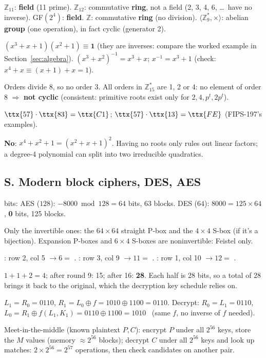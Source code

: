 \ans $\mathbb{Z}_{11}$: \textbf{field} (11 prime). $\mathbb{Z}_{12}$: commutative \textbf{ring}, not a field (2, 3, 4, 6, \dots\ have no inverse). GF$(2^4)$: \textbf{field}. $\mathbb{Z}$: commutative \textbf{ring} (no division). $\langle \mathbb{Z}_9^*, \times\rangle$: abelian \textbf{group} (one operation), in fact cyclic (generator 2).

\ans $(x^3 + x + 1)(x^2 + 1) \equiv \mathbf{1}$ (they are inverses: compare the worked example in Section~\ref{sec:algebra}). $(x^3 + x^2)^{-1} = x^3 + x$; \;$x^{-1} = x^3 + 1$ (check: $x^4 + x \equiv (x + 1) + x = 1$).

\ans Orders divide 8, so no order 3. All orders in $\mathbb{Z}_{15}^*$ are 1, 2 or 4: no element of order 8 $\Rightarrow$ \textbf{not cyclic} (consistent: primitive roots exist only for $2, 4, p^t, 2p^t$).

\ans $\ttx{57} \cdot \ttx{83} = \ttx{C1}$; \;$\ttx{57} \cdot \ttx{13} = \ttx{FE}$ (FIPS-197's examples).

\ans \textbf{No}: $x^4 + x^2 + 1 = (x^2 + x + 1)^2$. Having no roots only rules out linear factors; a degree-4 polynomial can split into two irreducible quadratics.

\subsection*{S. Modern block ciphers, DES, AES}
 bits: AES ($128$): $-8000 \bmod 128 = 64$ bits, 63 blocks. DES ($64$): $8000 = 125 \times 64$, \textbf{0} bits, 125 blocks.

\ans Only the invertible ones: the $64 \times 64$ straight P-box and the $4 \times 4$ S-box (if it's a bijection). Expansion P-boxes and $6 \times 4$ S-boxes are noninvertible: Feistel only.

\ans {}: row 2, col 5 $\to 6 =$ . : row 3, col 9 $\to 11 =$ . : row 1, col 10 $\to 12 =$ .

\ans $1 + 1 + 2 = 4$; after round 9: 15; after 16: \textbf{28}. Each half is 28 bits, so a total of 28 brings it back to the original, which the decryption key schedule relies on.

\ans $L_1 = R_0 = 0110$, $R_1 = L_0 \oplus f = 1010 \oplus 1100 = 0110$. Decrypt: $R_0 = L_1 = 0110$, $L_0 = R_1 \oplus f(L_1, K_1) = 0110 \oplus 1100 = 1010$ \checkmark\ (same $f$, no inverse of $f$ needed).

\ans Meet-in-the-middle (known plaintext $P, C$): encrypt $P$ under all $2^{56}$ keys, store the $M$ values (memory $\approx 2^{56}$ blocks); decrypt $C$ under all $2^{56}$ keys and look up matches: $2 \times 2^{56} = 2^{57}$ operations, then check candidates on another pair.

